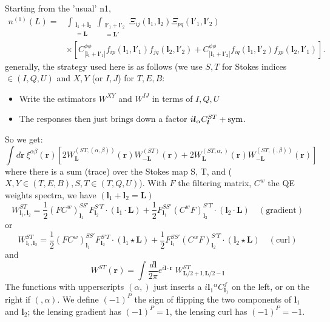 \documentclass[11pt]{article}
\begin{document}
\newcommand{\bl}{\boldsymbol{l}}
\newcommand{\br}{\boldsymbol{r}}
\newcommand{\hn}[0]{{\hat n}}

\newcommand{\bll}{\boldsymbol{L}}
\newcommand{\intL}{\int_{\substack{\bl_1 + \bl_2 \\ =\bll }}}
\newcommand{\intLp}{\int_{\substack{\bl'_1 + \bl'_2 \\ =\bll' }}}

\newcommand{\cred}[1]{\color{red} {#1} \color{black}}
Starting from the 'usual' n1,
\begin{equation}
\begin{split}
n^{(1)}(L) = &\intL \intLp \Xi_{ij}(\bl_1, \bl_2) \Xi_{pq}(\bl'_1, \bl'_2) \\ &\times\left[ C^{\phi \phi}_{|\bl_1+\bl'_1|}f_{ip}(\bl_1, \bl'_1) f_{jq}(\bl_2, \bl'_2) + C^{\phi \phi}_{|\bl_1+\bl'_2|}f_{iq}(\bl_1, \bl'_2) f_{jp}(\bl_2, \bl'_1) \right].
\end{split}
\end{equation}
generally, the strategy used here is as follows (we use $S,T$ for Stokes indices $\in (I, Q, U)$ and $X, Y$ (or $I, J$) for $T, E, B$:
\begin{itemize}
	\item Write the estimators $W^{XY}$ and $W^{IJ}$ in terms of $I,Q,U$
	\item The responses then just brings down a factor $i \bl_\alpha C^{ST}_{\bl} + \rm{sym}$.
\end{itemize}

So we get:
\begin{equation}\label{eq:rfftN1}\boxed{
 \int d\br \:	\xi^{\alpha \beta}(\br) \left[2W^{(ST, (\alpha, \beta))}_{\bll}(\br)W^{(ST)}_{-\bll}(\br) + 2 W^{(ST, \alpha,)}_{\bll}(\br)W^{(ST, (,\beta))}_{-\bll}(\br)\right]}
\end{equation}
where there is a sum (trace) over the Stokes map S, T, and ($X, Y \in (T, E ,B), S, T \in (T, Q, U)$). With $F$ the filtering matrix, $C^w$ the QE weights spectra, we have $(\bl_1 + \bl_2 = \bll)$
\begin{equation}
	W^{ST}_{\bl_1,\bl_2} = \frac 12 (FC^{w})^{SS'}_{\bl_1} F_{\bl_2}^{S'T} \cdot (\bl_1\cdot \bll) + \frac 12 F^{SS'}_{\bl_1} (C^wF)_{\bl_2}^{S'T} \cdot (\bl_2\cdot \bll)\quad (\textrm{gradient})
\end{equation}
or
\begin{equation}
	W^{ST}_{\bl_1,\bl_2} = \frac 12 (FC^{w})^{SS'}_{\bl_1} F_{\bl_2}^{S'T} \cdot (\bl_1\star \bll) + \frac 12 F^{SS'}_{\bl_1} (C^wF)_{\bl_2}^{S'T} \cdot (\bl_2\star \bll)\quad (\textrm{curl})
\end{equation}
and 
\begin{equation}
	W^{ST}(\br) = \int \frac{d\bl}{2\pi} e^{i \bl \cdot \br} \:W^{ST}_{\bll /2 +\bl, \bll/2 - \bl} 
\end{equation}
The functions with upperscripts $(\alpha,)$ just inserts a $i{\bl}{_1}^{\alpha} C^{f}_{\bl_1}$ on the left, or on the right if $(,\alpha)$.
We define $(-1)^P$ the sign of flipping the two components of $\bl_1$ and $\bl_2$; the lensing gradient has $(-1)^P = 1$, the lensing curl has $(-1)^P = -1$.
\end{document}
